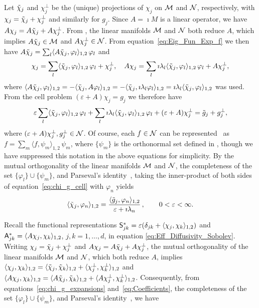 \documentclass[amsa]{ipart}
\begin{document}
Let $\tilde{\chi}_j$ and $\chi_j^\perp$ be the (unique) projections of $\chi_j$
on $\mathcal{M}$ and $\mathcal{N}$, respectively, with $\chi_j=\tilde{\chi}_j+\chi_j^\perp$ and
similarly for $g_j$. Since $A=\imath M$ is a linear operator, we have 
$A\chi_j=A\tilde{\chi}_j+A\chi_j^\perp$. From , the
linear manifolds $\mathcal{M}$ and $\mathcal{N}$ both reduce $A$, which implies 
$A\tilde{\chi}_j\in\mathcal{M}$ and $A\chi_j^\perp\in\mathcal{N}$. From
equation~\eqref{eq:Eig_Fun_Exp_f} we then have
$A\tilde{\chi}_j=\sum_l\langle A\tilde{\chi}_j,\varphi_l\rangle_{1,2}\,\varphi_l$ and       
%
\begin{align}\label{eq:chi_g_expansions}
  \chi_j=\sum_l\langle\chit_j,\varphi_l\rangle_{1,2}\,\varphi_l +\chi_j^\perp,
  \quad
  A\chi_j=\sum_l\imath\lambda_l\langle\chit_j,\varphi_l\rangle_{1,2}\,\varphi_l +A\chi_j^\perp,
\end{align}
%
where $\langle A\tilde{\chi}_j,\varphi_l\rangle_{1,2}=-\langle\tilde{\chi}_j,A\varphi_l\rangle_{1,2}=-\langle\tilde{\chi}_j,\imath
\lambda_l\varphi_l\rangle_{1,2}=\imath\lambda_l\langle\tilde{\chi}_j,\varphi_l\rangle_{1,2}$ was used. From the 
cell problem $(\varepsilon+A)\chi_j=g_j$ we therefore have
%
\begin{align}\label{eq:chi_g_cell}
  \varepsilon\sum_l\langle\chit_j,\varphi_l\rangle_{1,2}\,\varphi_l + \sum_l\imath\lambda_l\langle\chit_j,\varphi_l\rangle_{1,2}\,\varphi_l + (\varepsilon+A)\chi_j^\perp=\gt_j+g_j^\perp,
\end{align}
%
where $(\varepsilon+A)\chi_j^\perp,g_j^\perp\in\mathcal{N}$. Of course, each $f\in\mathcal{N}$ can be
represented~\cite{Stone:64} as $f=\sum_m\langle f,\psi_m\rangle_{1,2}\,\psi_m$, where $\{\psi_m\}$ is the
orthonormal set defined in , though we
have suppressed this notation in the above equations for
simplicity. By the mutual orthogonality of the linear manifolds
$\mathcal{M}$ and $\mathcal{N}$, the completeness of the set $\{\varphi_l\}\cup\{\psi_m\}$, and 
Parseval's identity~\cite{PapaRudin:87}, taking the inner-product of
both sides of equation~\eqref{eq:chi_g_cell} with $\varphi_n$ yields
%
\begin{align}\label{eq:Coefficients}
  \langle\chit_j,\varphi_n\rangle_{1,2}=\frac{\langle\gt_j,\varphi_n\rangle_{1,2}}{\varepsilon+\imath\lambda_n}\,,
  \qquad
  0<\varepsilon<\infty.
\end{align}
%




Recall the functional representations $\mathsf{S}^*_{jk}=\varepsilon(\delta_{jk}+\langle\chi_j,\chi_k\rangle_{1,2})$ and
$\mathsf{A}^*_{jk}=\langle A\chi_j,\chi_k\rangle_{1,2}$, $j,k=1,\ldots,d$, in equation 
\eqref{eq:Eff_Diffusivity_Sobolev}. Writing $\chi_j=\tilde{\chi}_j+\chi_j^\perp$ and
$A\chi_j=A\tilde{\chi}_j+A\chi_j^\perp$, the mutual orthogonality of the linear
manifolds $\mathcal{M}$ and $\mathcal{N}$, which both reduce $A$, implies 
$\langle\chi_j,\chi_k\rangle_{1,2}=\langle\tilde{\chi}_j,\tilde{\chi}_k\rangle_{1,2}+\langle\chi^\perp_j,\chi^\perp_k\rangle_{1,2}$ and
$\langle A\chi_j,\chi_k\rangle_{1,2}=\langle A\tilde{\chi}_j,\tilde{\chi}_k\rangle_{1,2}+\langle A\chi^\perp_j,\chi^\perp_k\rangle_{1,2}$. Consequently,
from equations~\eqref{eq:chi_g_expansions}
and~\eqref{eq:Coefficients}, the completeness of the set
$\{\varphi_l\}\cup\{\psi_m\}$, and Parseval's identity~\cite{PapaRudin:87}, we have  
\end{document}

